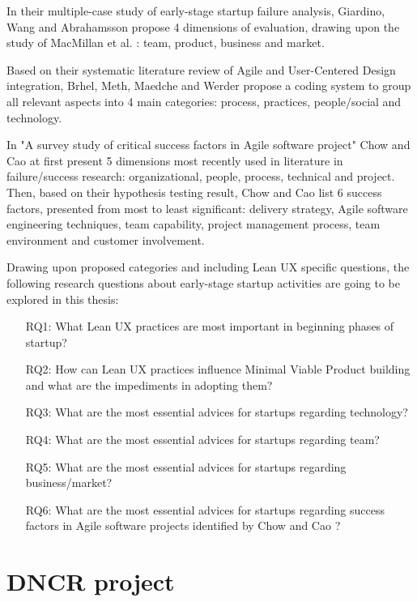 \documentclass{article}
\begin{document}
In their multiple-case study of early-stage startup failure analysis, Giardino, Wang and Abrahamsson \cite{giardino2014early} propose 4 dimensions of evaluation, drawing upon the study of MacMillan et al. \cite{macmillan1987criteria}: team, product, business and market.

Based on their systematic literature review of Agile and User-Centered Design integration, Brhel, Meth, Maedche and Werder \cite{brhel2015exploring} propose a coding system to group all relevant aspects into 4 main categories: process, practices, people/social and technology.

In "A survey study of critical success factors in Agile software project" Chow and Cao \cite{cao2008Agile} at first present 5 dimensions most recently used in literature in failure/success research: organizational, people, process, technical and project. Then, based on their hypothesis testing result, Chow and Cao list 6 success factors, presented from most to least significant: delivery strategy, Agile software engineering techniques, team capability, project management process, team environment and customer involvement.

Drawing upon proposed categories and including Lean UX specific questions, the following research questions about early-stage startup activities are going to be explored in this thesis:

\begin{itemize}
\item[RQ1:] What Lean UX practices are most important in beginning phases of startup?
\item[RQ2:] How can Lean UX practices influence Minimal Viable Product building and what are the impediments in adopting them?
\item[RQ3:] What are the most essential advices for startups regarding technology?
\item[RQ4:] What are the most essential advices for startups regarding team?
\item[RQ5:] What are the most essential advices for startups regarding business/market?
\item[RQ6:] What are the most essential advices for startups regarding success factors in Agile software projects identified by Chow and Cao \cite{cao2008Agile}?
\end{itemize}

\section{DNCR project}
\label{sec:dncr-project}
\end{document}
